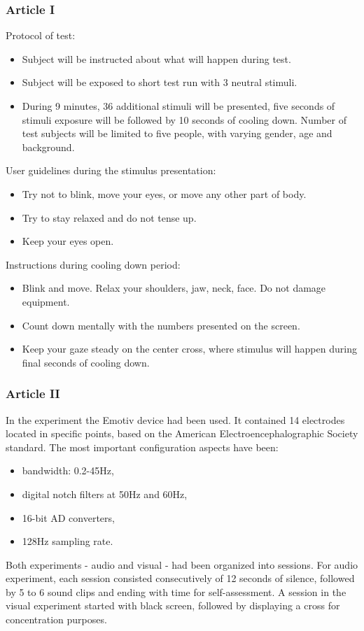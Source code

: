 \documentclass[10pt,journal,compsoc]{IEEEtran}
\begin{document}
\subsubsection*{Article I}
Protocol of test:
\begin{itemize}
\item{Subject will be instructed about what will happen during test.}
\item{Subject will be exposed to short test run with 3 neutral stimuli.}
\item{During 9 minutes, 36 additional stimuli will be presented, five seconds of stimuli exposure will be followed by 10 seconds of cooling down. Number of test subjects will be limited to five people, with varying gender, age and background.}
\end{itemize}
\vspace{0.in}
User guidelines during the stimulus presentation:
\begin{itemize}
\item{Try not to blink, move your eyes, or move any other part of body.}
\item{Try to stay relaxed and do not tense up.}
\item{Keep your eyes open.}
\end{itemize}
\vspace{0.in}
Instructions during cooling down period:
\begin{itemize}
\item{Blink and move. Relax your shoulders, jaw, neck, face. Do not damage equipment.}
\item{Count down mentally with the numbers presented on the screen.}
\item{Keep your gaze steady on the center cross, where stimulus will happen during final seconds of cooling down.}
\end{itemize}

\subsubsection*{Article II}
In the experiment the Emotiv device had been used. It contained 14 electrodes located in specific points, based on the American Electroencephalographic Society standard. The most important configuration aspects have been:
\begin{itemize}
\item{bandwidth: 0.2-45Hz,}
\item{digital notch filters at 50Hz and 60Hz,}
\item{16-bit AD converters,}
\item{128Hz sampling rate.}
\end{itemize}
Both experiments - audio and visual - had been organized into sessions. For audio experiment, each session consisted consecutively of 12 seconds of silence, followed by 5 to 6 sound clips and ending with time for self-assessment. A session in the visual experiment started with black screen, followed by displaying a cross for concentration purposes.
\end{document}
